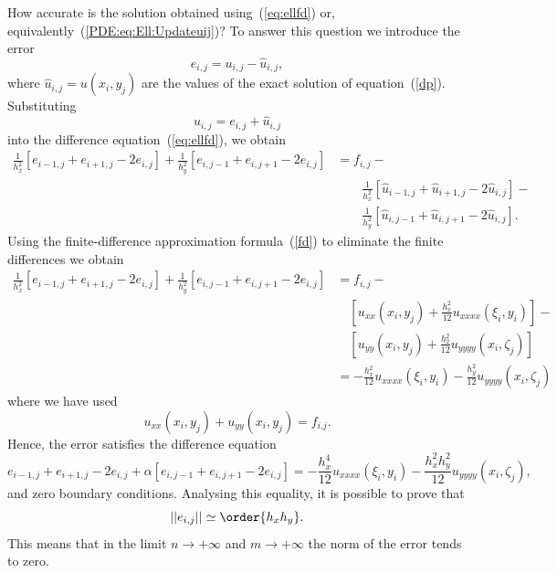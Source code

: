 How accurate is the solution obtained using~(\ref{eq:ellfd}) or,
equivalently~(\ref{PDE:eq:Ell:Updateuij})? To answer this question
we introduce the error
%
\begin{equation*}
  e_{i,j}=u_{i,j}-\hat u_{i,j},
\end{equation*}
%
where $\hat u_{i,j}=u(x_i,y_j)$ are the values of the exact solution
of equation~(\ref{dp}). Substituting
%
\begin{equation*}
  u_{i,j}=e_{i,j}+\hat u_{i,j}
\end{equation*}
%
into the difference equation~(\ref{eq:ellfd}), we obtain
%
\begin{align*}
 \frac{1}{h_x^2}[e_{i-1,j}+e_{i+1,j}-2e_{i,j}] +
 \frac{1}{h_y^2}[e_{i,j-1}+e_{i,j+1}-2e_{i,j}] &= f_{i,j} - \\
 & \qquad \frac{1}{h_x^2}[\hat u_{i-1,j}+\hat u_{i+1,j}-2\hat u_{i,j}] - \\
 & \qquad \frac{1}{h_y^2}[\hat u_{i,j-1}+\hat u_{i,j+1}-2\hat u_{i,j}].
\end{align*}
%
Using the finite-difference approximation formula~(\ref{fd}) to
eliminate the finite differences we obtain
%
\begin{align*}
  \frac{1}{h_x^2}[e_{i-1,j}+e_{i+1,j}-2e_{i,j}] +
     \frac{1}{h_y^2}[e_{i,j-1}+e_{i,j+1}-2e_{i,j}] & =
     f_{i,j} - \\
     & \quad [u_{xx}(x_i,y_j) + \frac{h_x^2}{12}u_{xxxx}(\xi_i,y_i)] -
     \\
     & \quad [u_{y y}(x_i,y_j)+\frac{h_2^2}{12}u_{yyyy}(x_i,\zeta_j)] \\
     & = - \frac{h_x^2}{12}u_{xxxx}(\xi_i,y_i) -
     \frac{h_y^2}{12}u_{yyyy}(x_i,\zeta_j)
\end{align*}
%
where we have used
%
\begin{equation*}
  u_{xx}(x_i,y_j)+u_{y y}(x_i,y_j)=f_{i.j}.
\end{equation*}
%
Hence, the error satisfies the difference equation
%
\begin{equation*}
  e_{i-1,j}+e_{i+1,j}-2e_{i,j}+\alpha[e_{i,j-1}+e_{i,j+1}-2e_{i,j}]=
  -\frac{h_x^4}{12}u_{xxxx}(\xi_i,y_i)-
  \frac{h_x^2 h_y^2}{12}u_{yyyy}(x_i,\zeta_j),
\end{equation*}
%
and zero boundary conditions. Analysing this equality, it is possible
to prove that
%
\begin{equation*}
  ||e_{i,j}|| \simeq \order{h_x h_y}.
\end{equation*}
%
This means that in the limit $n\to +\infty$ and $m\to +\infty$ the
norm of the error tends to zero.

